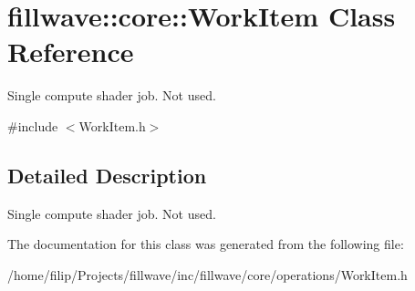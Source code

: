 \hypertarget{classfillwave_1_1core_1_1WorkItem}{}\section{fillwave\+:\+:core\+:\+:Work\+Item Class Reference}
\label{classfillwave_1_1core_1_1WorkItem}


Single compute shader job. Not used.  




{\ttfamily \#include $<$Work\+Item.\+h$>$}



\subsection{Detailed Description}
Single compute shader job. Not used. 

The documentation for this class was generated from the following file\+:\begin{DoxyCompactItemize}
\item 
/home/filip/\+Projects/fillwave/inc/fillwave/core/operations/Work\+Item.\+h\end{DoxyCompactItemize}

